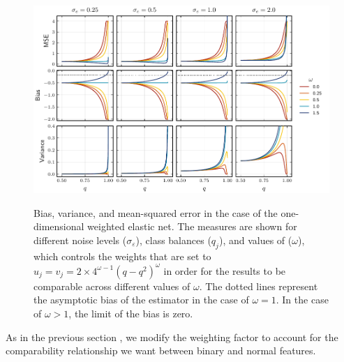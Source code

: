 \begin{figure}[htpb]
  \centering
  \includegraphics[]{plots/binary_onedim_bias_var_elnet.pdf}
  \label{fig:binary-onedim-bias-var-elnet}
  \caption{%
    Bias, variance, and mean-squared error in the case of the one-dimensional weighted elastic net. The measures are shown for different noise levels (\(\sigma_\varepsilon\)), class balances (\(q_j\)), and values of (\(\omega\)), which controls the weights that are set to \(u_j = v_j = 2\times 4^{\omega - 1}(q-q^2)^\omega\) in order for the results to be comparable across different values of \(\omega\).
    The dotted lines represent the asymptotic bias of the estimator
    in the case of \(\omega = 1\). In the case of \(\omega > 1\), the limit of the bias is zero.
  }
\end{figure}

As in the previous section , we modify the weighting factor to account
for the comparability relationship we want between binary and normal features.
